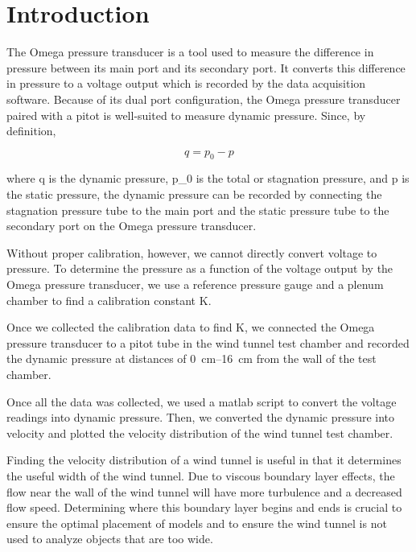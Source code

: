 \chapter{Introduction}
\label{cp:introduction}

The Omega pressure transducer is a tool used to measure the difference in pressure between its main port and its secondary port. It converts this difference in pressure to a voltage output which is recorded by the data acquisition software. Because of its dual port configuration, the Omega pressure transducer paired with a pitot is well-suited to measure dynamic pressure. Since, by definition,

\begin{equation}\label{eq:dynamic_pressure_expr}
    q = p_0 - p
\end{equation}

\noindent{}where \gls{q} is the dynamic pressure, \gls{p_0} is the total or stagnation pressure, and \gls{p} is the static pressure, the dynamic pressure can be recorded by connecting the stagnation pressure tube to the main port and the static pressure tube to the secondary port on the Omega pressure transducer.

Without proper calibration, however, we cannot directly convert voltage to pressure. To determine the pressure as a function of the voltage output by the Omega pressure transducer, we use a reference pressure gauge and a plenum chamber to find a calibration constant \gls{K}.

Once we collected the calibration data to find \gls{K}, we connected the Omega pressure transducer to a pitot tube in the wind tunnel test chamber and recorded the dynamic pressure at distances of \qtyrange{0}{16}{\centi\meter} from the wall of the test chamber.

Once all the data was collected, we used a \acrfull{matlab} script to convert the voltage readings into dynamic pressure. Then, we converted the dynamic pressure into velocity and plotted the velocity distribution of the wind tunnel test chamber.

Finding the velocity distribution of a wind tunnel is useful in that it determines the useful width of the wind tunnel. Due to viscous boundary layer effects, the flow near the wall of the wind tunnel will have more turbulence and a decreased flow speed. Determining where this boundary layer begins and ends is crucial to ensure the optimal placement of models and to ensure the wind tunnel is not used to analyze objects that are too wide.